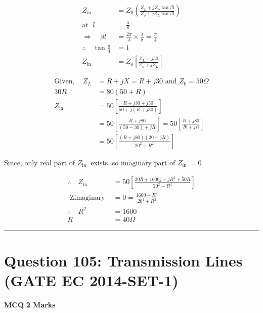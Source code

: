 \documentclass[11pt,a4paper]{article}
\begin{document}
\begin{tcolorbox}[solbox, title=Detailed Solution -- Question 104]
\[
\begin{aligned} Z_{\text {in }}&=Z_{0}\left(\frac{Z_{L}+j Z_{o} \tan \beta l}{Z_{o}+j Z_{L} \tan \beta l}\right)\\ \text{at }\;l&=\frac{\lambda}{8} \\ \Rightarrow \quad \beta l&=\frac{2 \pi}{\lambda} \times \frac{\lambda}{8}=\frac{\pi}{4} \\ \therefore \quad\tan \frac{\pi}{4}&=1 \\ Z_{\text {in }}&=Z_{o}\left[\frac{Z_{L}+j 50}{Z_{o}+j Z_{L}}\right] \end{aligned}
\]

\[
\begin{aligned} \text{Given},\quad Z_{L}&=R+j X=R+j 30 \text{ and }Z_{0}=50 \Omega \\ 30 R &=80(50+R) \\ Z_{\text {in }} &=50\left[\frac{R+j 30+j 50}{50+j(R+j 30)}\right] \\ &=50\left[\frac{R+j 80}{(50-30)+j R}\right]=50\left[\frac{R+j 80}{20+j R}\right] \\ &=50\left[\frac{(R+j 80)(20-j R)}{20^{2}+R^{2}}\right] \end{aligned}
\]

 Since, only real part of $Z_{\text {in }}$ exists, so imaginary 
 part of $Z_{\text {in }}=0$

\[
\begin{aligned} \therefore \quad Z_{\text {in }} &=50\left[\frac{20 R+1600 j-j R^{2}+50 R}{20^{2}+R^{2}}\right] \\ \text { Zimaginary } &=0=\frac{1600-R^{2}}{20^{2}+R^{2}}\\ \therefore \quad R^{2} &=1600 \\ R &=40 \Omega \end{aligned}
\]
\end{tcolorbox}

\vspace{1.5em}
\hrule
\vspace{1.5em}

\section*{Question 105: Transmission Lines (GATE EC 2014-SET-1)}
\noindent \textbf{\color{primary}MCQ} \hfill \textbf{\color{secondary}2 Marks}
\end{document}

